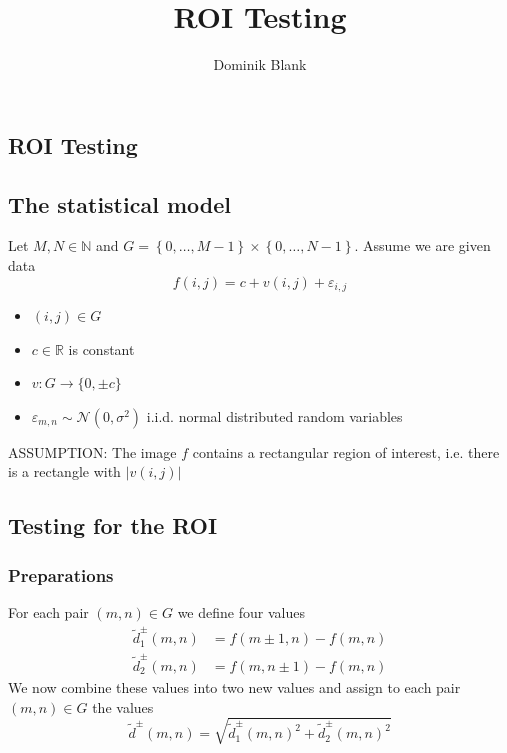 \documentclass{beamer}
\author{Dominik Blank}
\title{ROI Testing}
\newcommand{\abs}[1]{\lvert#1\rvert}
\begin{document}
\begin{frame}
	\tableofcontents
\end{frame}

\begin{frame}
	\section{ROI Testing}
	
	\subsection{The statistical model}
	
	Let $M, N \in \mathbb{N}$ and $G = \left\{ 0, \dots, M-1 \right\} \times  \left\{ 0, \dots, N-1 \right\}$. Assume we are given data
	\begin{equation*}\label{f}
		f(i, j) = c + v(i, j) + \varepsilon_{i, j}
	\end{equation*}
	\begin{itemize}
		\item $(i, j) \in G$
		\item $c \in \mathbb{R}$ is constant
		\item $v: G \to \{ 0, \pm c \}$
		\item $\varepsilon_{m, n} \sim \mathcal{N}(0, \sigma^2)$ i.i.d. normal distributed random variables
	\end{itemize}
	
	ASSUMPTION: The image $f$ contains a rectangular region of interest, i.e. there is a rectangle with $\abs{v(i, j)}$ 
\end{frame}

\begin{frame}
	\subsection{Testing for the ROI}
	
	\subsubsection{Preparations}
	
	For each pair $(m, n) \in G$ we define four values
	\begin{align}
		\tilde{d}^\pm_1(m, n) &= f(m \pm 1, n) - f(m, n) \label{d1} \\
		\tilde{d}^\pm_2(m, n) &= f(m, n \pm 1) - f(m, n) \label{d2}
	\end{align}
	We now combine these values into two new values and assign to each pair $(m, n) \in G$ the values
	\begin{equation*}\label{d_tilde}
		\tilde{d}^\pm(m, n) = \sqrt{\tilde{d}_1^\pm(m, n)^2 + \tilde{d}_2^\pm(m, n)^2}
	\end{equation*}
\end{frame}
\end{document}
